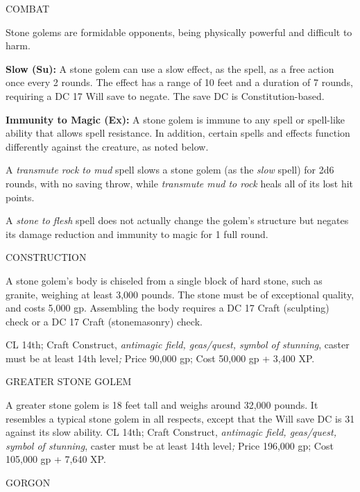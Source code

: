 \documentclass{article}
\begin{document}
COMBAT

Stone golems are formidable opponents, being physically powerful and difficult 
to harm.

\textbf{Slow (Su): }A stone golem can use a slow effect, as the spell, as a free 
action once every 2 rounds. The effect has a range of 10 feet and a duration of 
7 rounds, requiring a DC 17 Will save to negate. The save DC is Constitution-based.

\textbf{Immunity to Magic (Ex):} A stone golem is immune to any spell or spell-like 
ability that allows spell resistance. In addition, certain spells and effects function 
differently against the creature, as noted below.

A \textit{transmute rock to mud }spell slows a stone golem (as the \textit{slow 
}spell) for 2d6 rounds, with no saving throw, while \textit{transmute mud to rock 
}heals all of its lost hit points.

A \textit{stone to flesh }spell does not actually change the golem's structure 
but negates its damage reduction and immunity to magic for 1 full round.

CONSTRUCTION

A stone golem's body is chiseled from a single block of hard stone, such as granite, 
weighing at least 3,000 pounds. The stone must be of exceptional quality, and costs 
5,000 gp. Assembling the body requires a DC 17 Craft (sculpting) check or a DC 
17 Craft (stonemasonry) check.

CL 14th; Craft Construct, \textit{antimagic field, geas/quest, symbol of stunning}, 
caster must be at least 14th level\textit{; }Price 90,000 gp; Cost 50,000 gp + 
3,400 XP.

\vspace{12pt}
GREATER STONE GOLEM

A greater stone golem is 18 feet tall and weighs around 32,000 pounds. It resembles 
a typical stone golem in all respects, except that the Will save DC is 31 against 
its slow ability. CL 14th; Craft Construct, \textit{antimagic field, geas/quest, 
symbol of stunning}, caster must be at least 14th level\textit{; }Price 196,000 
gp; Cost 105,000 gp + 7,640 XP.

\vspace{12pt}
{\LARGE{}GORGON}
\end{document}
